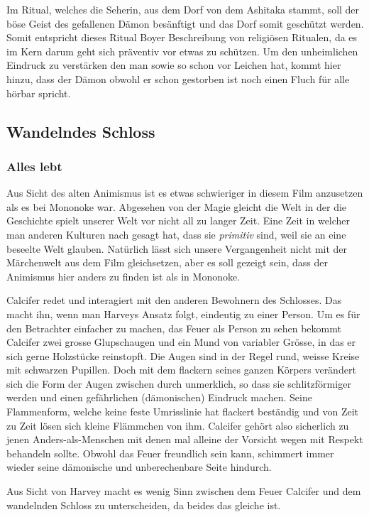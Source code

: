 Im Ritual, welches die Seherin, aus dem Dorf von dem Ashitaka stammt, soll der böse Geist des gefallenen Dämon besänftigt und das Dorf somit geschützt werden. Somit entspricht dieses Ritual Boyer Beschreibung von religiösen Ritualen, da es im Kern darum geht sich präventiv vor etwas zu schützen. Um den unheimlichen Eindruck zu verstärken den man sowie so schon vor Leichen hat, kommt hier hinzu, dass der Dämon obwohl er schon gestorben ist noch einen Fluch für alle hörbar spricht.

\subsection{Wandelndes Schloss}
\subsubsection{Alles lebt}
Aus Sicht des alten Animismus ist es etwas schwieriger in diesem Film anzusetzen als es bei Mononoke war. Abgesehen von der Magie gleicht die Welt in der die Geschichte spielt unserer Welt vor nicht all zu langer Zeit. Eine Zeit in welcher man anderen Kulturen nach gesagt hat, dass sie \emph{primitiv} sind, weil sie an eine beseelte Welt glauben. Natürlich lässt sich unsere Vergangenheit nicht mit der Märchenwelt aus dem Film gleichsetzen, aber es soll gezeigt sein, dass der Animismus hier anders zu finden ist als in Mononoke.

Calcifer redet und interagiert mit den anderen Bewohnern des Schlosses. Das macht ihn, wenn man Harveys Ansatz folgt, eindeutig zu einer Person. Um es für den Betrachter einfacher zu machen, das Feuer als Person zu sehen bekommt Calcifer zwei grosse Glupschaugen und ein Mund von variabler Grösse, in das er sich gerne Holzstücke reinstopft. Die Augen sind in der Regel rund, weisse Kreise mit schwarzen Pupillen. Doch mit dem flackern seines ganzen Körpers verändert sich die Form der Augen zwischen durch unmerklich, so dass sie schlitzförmiger werden und einen gefährlichen (dämonischen) Eindruck machen. Seine Flammenform, welche keine feste Umrisslinie hat flackert beständig und von Zeit zu Zeit lösen sich kleine Flämmchen von ihm. Calcifer gehört also sicherlich zu jenen Anders-als-Menschen mit denen mal alleine der Vorsicht wegen mit Respekt behandeln sollte. Obwohl das Feuer freundlich sein kann, schimmert immer wieder seine dämonische und unberechenbare Seite hindurch.

Aus Sicht von Harvey macht es wenig Sinn zwischen dem Feuer Calcifer und dem wandelnden Schloss zu unterscheiden, da beides das gleiche ist.

